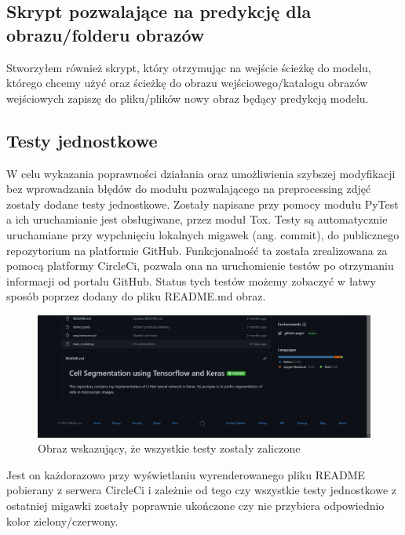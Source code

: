 \documentclass{article}
\begin{document}
\subsection{Skrypt pozwalające na predykcję dla obrazu/folderu obrazów}
Stworzyłem również skrypt, który otrzymując na wejście ścieżkę do modelu, którego chcemy użyć oraz
ścieżkę do obrazu wejściowego/katalogu obrazów wejściowych zapiszę do pliku/plików nowy obraz będący predykcją modelu.
\subsection{Testy jednostkowe}
W celu wykazania poprawności działania oraz umożliwienia szybszej modyfikacji bez wprowadzania błędów do modułu pozwalającego na preprocessing zdjęć zostały dodane testy jednostkowe.
Zostały napisane przy pomocy modułu PyTest a ich uruchamianie jest obsługiwane, przez moduł Tox.
Testy są automatycznie uruchamiane przy wypchnięciu lokalnych migawek (ang. commit), do publicznego repozytorium na platformie GitHub.
Funkcjonalność ta została zrealizowana za pomocą platformy CircleCi, pozwala ona na uruchomienie testów po otrzymaniu informacji od portalu GitHub.
Status tych testów możemy zobaczyć w łatwy sposób poprzez dodany do pliku README.md obraz.
\begin{figure}[H]
    \centering
    \includegraphics[width=\linewidth]{images/ci.png}
    \caption{Obraz wskazujący, że wszystkie testy zostały zaliczone}
\end{figure}
Jest on każdorazowo przy wyświetlaniu wyrenderowanego pliku README pobierany z serwera CircleCi i zależnie od tego czy wszystkie testy jednostkowe z ostatniej migawki zostały poprawnie ukończone czy nie przybiera odpowiednio kolor zielony/czerwony.
\end{document}
